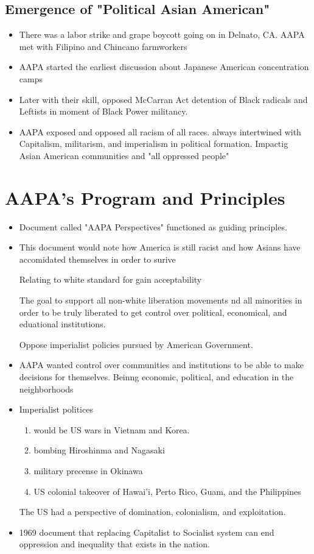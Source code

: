 \documentclass{article}
\begin{document}
\subsection{Emergence of "Political Asian American"}
\begin{itemize}
  \item There was a labor strike and grape boycott
    going on in Delnato, CA.
    AAPA met with Filipino and Chincano farmworkers
  \item AAPA started the earliest discussion about Japanese American concentration camps 
  \item Later with their skill, opposed McCarran Act detention
    of Black radicals and Leftists in moment of Black Power militancy.
  \item AAPA exposed and opposed all racism of all races.
    always intertwined with Capitalism, militarism, and imperialism in political formation.
    Impactig Asian American communities and "all oppressed people"
\end{itemize}

\section*{AAPA's Program and Principles}
\begin{itemize}
  \item Document called "AAPA Perspectives" functioned as guiding principles.
  \item This document would note how
    America is still racist and how Asians have accomidated themselves in order to surive

    Relating to white standard for gain acceptability

    The goal to support all non-white liberation movements nd all
    minorities in order to be truly liberated to get control over
    political, economical, and eduational institutions.

    Oppose imperialist policies pursued by American Government.
  \item AAPA wanted control over communities and institutions
    to be able to make decisions for themselves.
    Beinng economic, political, and education in the neighborhoods
  \item Imperialist politices 
    \begin{enumerate}
      \item would be US wars in Vietnam and Korea.
      \item bombing Hiroshinma and Nagasaki
      \item military precense in Okinawa
      \item US colonial takeover of Hawai'i, Perto Rico, Guam, and the Philippines
    \end{enumerate}

    The US had a perspective of domination, colonialism, and exploitation.

  \item 1969 document that replacing Capitalist to Socialist system
    can end oppression and inequality that exists in the nation.


\end{itemize}
\end{document}
